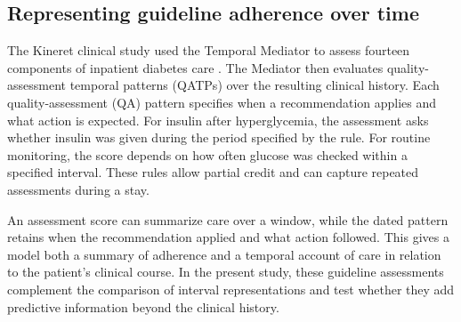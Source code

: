 \subsection{Representing guideline adherence over time}
The Kineret clinical study used the Temporal Mediator to assess fourteen components of inpatient diabetes care \citep{oded2027kineret-jbi,hochberg2023inpatient}. The Mediator then evaluates quality-assessment temporal patterns (QATPs) over the resulting clinical history. Each quality-assessment (QA) pattern specifies when a recommendation applies and what action is expected. For insulin after hyperglycemia, the assessment asks whether insulin was given during the period specified by the rule. For routine monitoring, the score depends on how often glucose was checked within a specified interval. These rules allow partial credit and can capture repeated assessments during a stay.

An assessment score can summarize care over a window, while the dated pattern retains when the recommendation applied and what action followed. This gives a model both a summary of adherence and a temporal account of care in relation to the patient's clinical course. In the present study, these guideline assessments complement the comparison of interval representations and test whether they add predictive information beyond the clinical history.
